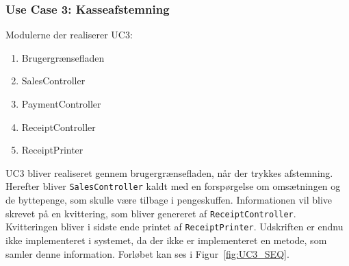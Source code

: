 \subsubsection{Use Case 3: Kasseafstemning}

Modulerne der realiserer UC3:
\begin{enumerate}
	\item Brugergrænsefladen
	\item SalesController
	\item PaymentController
	\item ReceiptController
	\item ReceiptPrinter
\end{enumerate}

UC3 bliver realiseret gennem brugergrænsefladen, når der trykkes afstemning. Herefter bliver \texttt{SalesController} kaldt med en forspørgelse om omsætningen og de byttepenge, som skulle være tilbage i pengeskuffen. Informationen vil blive skrevet på en kvittering, som bliver genereret af \texttt{ReceiptController}. Kvitteringen bliver i sidste ende printet af \texttt{ReceiptPrinter}. Udskriften er endnu ikke implementeret i systemet, da der ikke er implementeret en metode, som samler denne information. Forløbet kan ses i Figur~\ref{fig:UC3_SEQ}.

